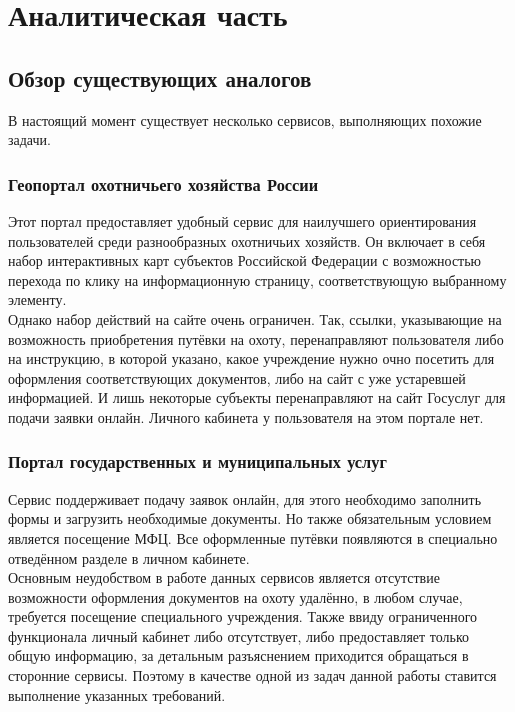 \section{Аналитическая часть}	
	\subsection{Обзор существующих аналогов}
	В настоящий момент существует несколько сервисов, выполняющих похожие задачи.
	
	\subsubsection{Геопортал охотничьего хозяйства России}
	Этот портал предоставляет удобный сервис для наилучшего ориентирования пользователей среди разнообразных охотничьих хозяйств. Он включает в себя набор интерактивных карт субъектов Российской Федерации с возможностью перехода по клику на информационную страницу, соответствующую выбранному элементу. \cite{maps} \\
	
	Однако набор действий на сайте очень ограничен. Так, ссылки, указывающие на возможность приобретения путёвки на охоту, перенаправляют пользователя либо на инструкцию, в которой указано, какое учреждение нужно очно посетить для оформления соответствующих документов, либо на сайт с уже устаревшей информацией. И лишь некоторые субъекты перенаправляют на сайт Госуслуг для подачи заявки онлайн. Личного кабинета у пользователя на этом портале нет. \\
	
	\subsubsection{Портал государственных и муниципальных услуг}
	Сервис поддерживает подачу заявок онлайн, для этого необходимо заполнить формы и загрузить необходимые документы. Но также обязательным условием является посещение МФЦ. Все оформленные путёвки появляются в специально отведённом разделе в личном кабинете.\\
	
	Основным неудобством в работе данных сервисов является отсутствие возможности оформления документов на охоту удалённо, в любом случае, требуется посещение специального учреждения. Также ввиду ограниченного функционала личный кабинет либо отсутствует, либо предоставляет только общую информацию, за детальным разъяснением приходится обращаться в сторонние сервисы. Поэтому в качестве одной из задач данной работы ставится выполнение указанных требований.
	
